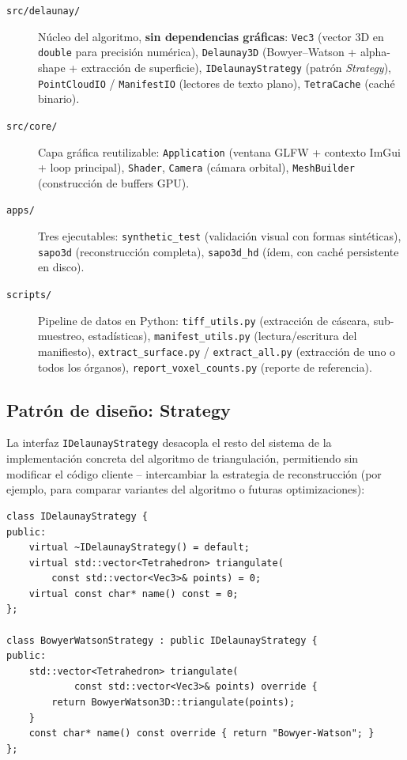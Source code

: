 \documentclass[12pt,a4paper]{article}
\begin{document}
\begin{description}
    \item[\texttt{src/delaunay/}] Núcleo del algoritmo, \textbf{sin
    dependencias gráficas}: \texttt{Vec3} (vector 3D en \texttt{double}
    para precisión numérica), \texttt{Delaunay3D}
    (Bowyer--Watson + alpha-shape + extracción de superficie),
    \texttt{IDelaunayStrategy} (patrón \emph{Strategy}),
    \texttt{PointCloudIO} / \texttt{ManifestIO} (lectores de texto
    plano), \texttt{TetraCache} (caché binario).
    \item[\texttt{src/core/}] Capa gráfica reutilizable:
    \texttt{Application} (ventana GLFW + contexto ImGui + loop
    principal), \texttt{Shader}, \texttt{Camera} (cámara orbital),
    \texttt{MeshBuilder} (construcción de buffers GPU).
    \item[\texttt{apps/}] Tres ejecutables: \texttt{synthetic\_test}
    (validación visual con formas sintéticas), \texttt{sapo3d}
    (reconstrucción completa), \texttt{sapo3d\_hd} (ídem, con caché
    persistente en disco).
    \item[\texttt{scripts/}] Pipeline de datos en Python:
    \texttt{tiff\_utils.py} (extracción de cáscara, sub-muestreo,
    estadísticas), \texttt{manifest\_utils.py} (lectura/escritura del
    manifiesto), \texttt{extract\_surface.py} / \texttt{extract\_all.py}
    (extracción de uno o todos los órganos), \texttt{report\_voxel\_counts.py}
    (reporte de referencia).
\end{description}

\subsection{Patrón de diseño: Strategy}

La interfaz \texttt{IDelaunayStrategy} desacopla el resto del sistema
de la implementación concreta del algoritmo de triangulación,
permitiendo sin modificar el código cliente -- intercambiar la
estrategia de reconstrucción (por ejemplo, para comparar variantes del
algoritmo o futuras optimizaciones):

\begin{lstlisting}[caption={Patrón Strategy sobre el algoritmo de triangulación}]
class IDelaunayStrategy {
public:
    virtual ~IDelaunayStrategy() = default;
    virtual std::vector<Tetrahedron> triangulate(
        const std::vector<Vec3>& points) = 0;
    virtual const char* name() const = 0;
};

class BowyerWatsonStrategy : public IDelaunayStrategy {
public:
    std::vector<Tetrahedron> triangulate(
            const std::vector<Vec3>& points) override {
        return BowyerWatson3D::triangulate(points);
    }
    const char* name() const override { return "Bowyer-Watson"; }
};
\end{lstlisting}
\end{document}
